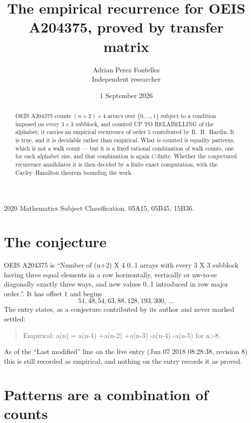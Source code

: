 \documentclass[11pt,a4paper]{article}
\title{The empirical recurrence for OEIS A204375, proved by transfer matrix}
\author{Adrian Perez Fontelles\\ \small Independent researcher}
\date{1 September 2026}
\theoremstyle{plain}
\theoremstyle{definition}
\begin{document}
\maketitle

\begin{abstract}
OEIS A204375 counts $(n+2)\times4$ arrays over $\{0,\dots,1\}$ subject to a condition imposed on
every $3\times3$ subblock, and counted UP TO RELABELLING of the
alphabet; it carries an empirical recurrence of order $5$ contributed by
R.~H.~Hardin. It is true, and it is decidable rather than empirical. What is counted is
equality patterns, which is not a walk count --- but it is a fixed rational combination of
walk counts, one for each alphabet size, and that combination is again $C$-finite. Whether the
conjectured recurrence annihilates it is then decided by a finite exact computation, with the
Cayley--Hamilton theorem bounding the work.
\end{abstract}

\noindent\small 2020 Mathematics Subject Classification. 05A15, 05B45, 15B36.\normalsize

\section{The conjecture}

OEIS A204375 is ``Number of (n+2) X 4 0..1 arrays with every 3 X 3 subblock having three equal elements in a row horizontally, vertically or nw-to-se diagonally exactly three ways, and new values 0..1 introduced in row major order.''. It has offset $1$ and begins
\[
51, 48, 54, 63, 88, 128, 193, 300,\ \dots
\]
The entry states, as a conjecture contributed by its author and never marked settled:
\begin{quote}
Empirical: a(n) = a(n-1) +a(n-2) +a(n-3) -a(n-4) -a(n-5) for n>8.
\end{quote}
As of the ``Last modified'' line on the live entry (Jun 07 2018 08:28:38, revision 8) this is still
recorded as empirical, and nothing on the entry records it as proved.

\section{Patterns are a combination of counts}
\end{document}
